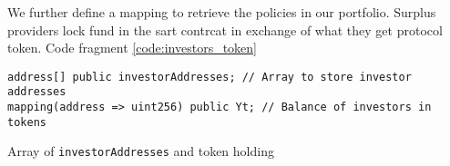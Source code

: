 \documentclass[10pt]{article}
\begin{document}
We further define a mapping to retrieve the policies in our portfolio. Surplus providers lock fund in the sart contrcat in exchange of what they get protocol token. Code fragment \ref{code:investors_token}

\begin{codefragment}[!h]
\begin{lstlisting}[language=Solidity]
address[] public investorAddresses; // Array to store investor addresses
mapping(address => uint256) public Yt; // Balance of investors in tokens

\end{lstlisting}
    \caption{Array of \texttt{investorAddresses} and token holding}
    \label{code:investors_token}
\end{codefragment}



\end{document}
